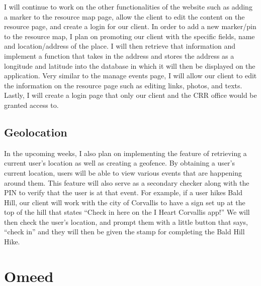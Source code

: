 \documentclass[draftclsnofoot, onecolumn, 10pt, compsoc]{IEEEtran}
\begin{document}
         I will continue to work on the other functionalities of the website such as adding a marker to the resource map page, allow the client to edit the content on the resource page, and create a login for our client. In order to add a new marker/pin to the resource map, I plan on promoting our client with the specific fields, name and location/address of the place. I will then retrieve that information and implement a function that takes in the address and stores the address as a longitude and latitude into the database in which it will then be displayed on the application. Very similar to the manage events page, I will allow our client to edit the information on the resource page such as editing links, photos, and texts. Lastly, I will create a login page that only our client and the CRR office would be granted access to.

      \subsection{Geolocation}
         In the upcoming weeks, I also plan on implementing the feature of retrieving a current user’s location as well as creating a geofence. By obtaining a user’s current location, users will be able to view various events that are happening around them. This feature will also serve as a secondary checker along with the PIN to verify that the user is at that event. For example, if a user hikes Bald Hill, our client will work with the city of Corvallis to have a sign set up at the top of the hill that states “Check in here on the I Heart Corvallis app!” We will then check the user’s location, and prompt them with a little button that says, “check in” and they will then be given the stamp for completing the Bald Hill Hike.

   \section{Omeed}
\end{document}
